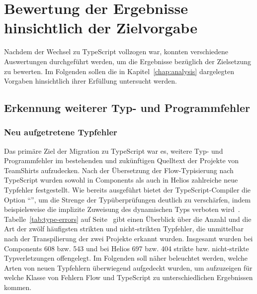 \section{Bewertung der Ergebnisse hinsichtlich der Zielvorgabe}

Nachdem der Wechsel zu TypeScript vollzogen war, konnten verschiedene Auswertungen durchgeführt werden, um die Ergebnisse bezüglich der Zielsetzung zu bewerten. Im Folgenden sollen die in Kapitel~\ref{chap:analysis} dargelegten Vorgaben hinsichtlich ihrer Erfüllung untersucht werden.

\subsection{Erkennung weiterer Typ- und Programmfehler}
\label{goal:new-type-errors}

\subsubsection{Neu aufgetretene Typfehler}

Das primäre Ziel der Migration zu TypeScript war es, weitere Typ- und Programmfehler im bestehenden und zukünftigen Quelltext der Projekte von TeamShirts aufzudecken. Nach der Übersetzung der Flow-Typisierung nach TypeScript wurden sowohl in Components als auch in Helios zahlreiche neue Typfehler festgestellt. Wie bereits ausgeführt bietet der TypeScript-Compiler die Option \enquote{}, um die Strenge der Typüberprüfungen deutlich zu verschärfen, indem beispielsweise die implizite Zuweisung des dynamischen Typs  verboten wird~\autocite{TSC:OPTIONS}. Tabelle~\ref{tab:type-errors} auf Seite~\pageref{tab:type-errors} gibt einen Überblick über die Anzahl und die Art der zwölf häufigsten strikten und nicht-strikten Typfehler, die unmittelbar nach der Transpilierung der zwei Projekte erkannt wurden. Insgesamt wurden bei Components 608 bzw. 543 und bei Helios 697 bzw. 404 strikte bzw. nicht-strikte Typverletzungen offengelegt. Im Folgenden soll näher beleuchtet werden, welche Arten von neuen Typfehlern überwiegend aufgedeckt wurden, um aufzuzeigen für welche Klasse von Fehlern Flow und TypeScript zu unterschiedlichen Ergebnissen kommen.



